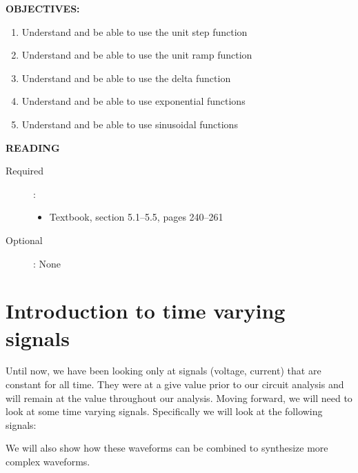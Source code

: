 \documentclass{handout}
\begin{document}
\maketitle

\textbf{OBJECTIVES:}
\begin{enumerate}
\item Understand and be able to use the unit step function
\item Understand and be able to use the unit ramp function
\item Understand and be able to use the delta function
\item Understand and be able to use  exponential functions
\item Understand and be able to use sinusoidal functions
\end{enumerate}

\textbf{READING}
\begin{description}
\item [Required]:
\begin{itemize}
\item  Textbook, section 5.1--5.5, pages 240--261
\end{itemize}
\item [Optional]: None
\end{description}

\section{Introduction to time varying signals}
Until now, we have been looking only at signals (voltage, current) that are constant for all time.  They were at a give value prior to our circuit analysis and will remain at the value throughout our analysis.  Moving forward, we will need to look at some time varying signals.  Specifically we will look at the following signals:


We will also show how these waveforms can be combined to synthesize more complex waveforms.

\newpage
\clearpage
\pagebreak
\end{document}
